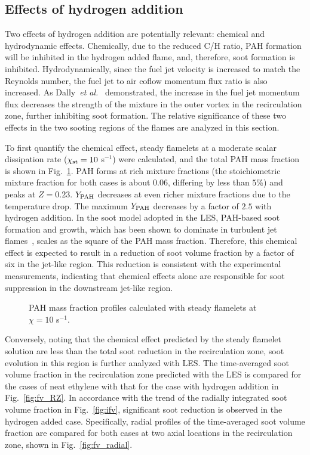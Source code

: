 \documentclass[review,3p,times]{elsarticle}
\begin{document}
\subsection{Effects of hydrogen addition}

Two effects of hydrogen addition are potentially relevant: chemical and hydrodynamic effects.  Chemically, due to the reduced C/H ratio, PAH formation will be inhibited in the hydrogen added flame, and, therefore, soot formation is inhibited.  Hydrodynamically, since the fuel jet velocity is increased to match the Reynolds number, the fuel jet to air coflow momentum flux ratio is also increased.  As Dally~\emph{et al.}~\cite{dally98b} demonstrated, the increase in the fuel jet momentum flux decreases the strength of the mixture in the outer vortex in the recirculation zone, further inhibiting soot formation.  The relative significance of these two effects in the two sooting regions of the flames are analyzed in this section.

To first quantify the chemical effect, steady flamelets at a moderate scalar dissipation rate ($\chi_{\rm st} = 10$ s$^{-1}$) were calculated, and the total PAH mass fraction is shown in Fig.~\ref{fig:flamelet}.  PAH forms at rich mixture fractions (the stoichiometric mixture fraction for both cases is about $0.06$, differing by less than $5$\%) and peaks at $Z = 0.23$.  $Y_{\rm PAH}$ decreases at even richer mixture fractions due to the temperature drop.  The maximum $Y_{\rm PAH}$ decreases by a factor of $2.5$ with hydrogen addition.  In the soot model adopted in the LES, PAH-based soot formation and growth, which has been shown to dominate in turbulent jet flames~\cite{bisetti12,attili14,attili15,mueller12,mueller13}, scales as the square of the PAH mass fraction.  Therefore, this chemical effect is expected to result in a reduction of soot volume fraction by a factor of six in the jet-like region.  This reduction is consistent with the experimental measurements, indicating that chemical effects alone are responsible for soot suppression in the downstream jet-like region.

\begin{figure}[t]
  \centering
  \scriptsize
  \resizebox{0.5\textwidth}{!}{}
  \normalsize
  \vspace{-0.2in}
  \caption{PAH mass fraction profiles calculated with steady flamelets at $\chi = 10$ s$^{-1}$.}
  \label{fig:flamelet}
\end{figure}


Conversely, noting that the chemical effect predicted by the steady flamelet solution are less than the total soot reduction in the recirculation zone, soot evolution in this region is further analyzed with LES.  The time-averaged soot volume fraction in the recirculation zone predicted with the LES is compared for the cases of neat ethylene with that for the case with hydrogen addition in Fig.~\ref{fig:fv_RZ}.  In accordance with the trend of the radially integrated soot volume fraction in Fig.~\ref{fig:ifv}, significant soot reduction is observed in the hydrogen added case.  Specifically, radial profiles of the time-averaged soot volume fraction are compared for both cases at two axial locations in the recirculation zone, shown in Fig.~\ref{fig:fv_radial}.
\end{document}
